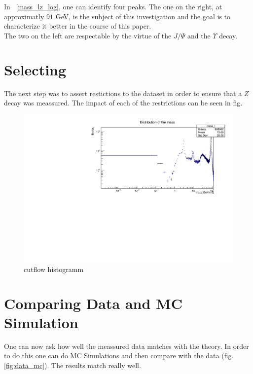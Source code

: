 \documentclass[12pt, a4paper, bibliography=totoc]{scrreprt}
\begin{document}
In ~\ref{mass_lz_log}, one can identify four peaks. 
The one on the right, at approximatly $91$ \si{GeV}, is the subject of this investigation and the goal is to characterize it better in the course of this paper.\\
The two on the left are respectable by the virtue of the $J/{\Psi}$ and the $\Upsilon$ decay. 

\section{Selecting} 
The next step was to assert restictions to the dataset in order to ensure that a $Z$ decay was meassured.
The impact of each of the restrictions can be seen in fig. 
\begin{figure}[h]
	\centering
	\includegraphics[scale=0.5]{fig/mass_lz_log.pdf}
	\caption{cutflow histogramm}
	\label{fig:cutflow}
\end{figure}

\section{Comparing Data and MC Simulation}
One can now ask how well the meassured data matches with the theory. 
In order to do this one can do MC Simulations and then compare with the data (fig. \ref{fig:data_mc}).
The results match really well.
\end{document}
